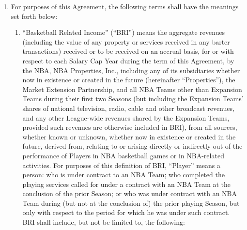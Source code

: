\documentclass[
]{book}
\providecommand{\tightlist}{%
  \setlength{\itemsep}{0pt}\setlength{\parskip}{0pt}}
\begin{document}
\begin{enumerate}
\def\labelenumi{(\alph{enumi})}
\tightlist
\item
  For purposes of this Agreement, the following terms shall have the meanings set forth below:

  \begin{enumerate}
  \def\labelenumii{(\arabic{enumii})}
  \tightlist
  \item
    ``Basketball Related Income'' (``BRI'') means the aggregate revenues (including the value of any property or services received in any barter transactions) received or to be received on an accrual basis, for or with respect to each Salary Cap Year during the term of this Agreement, by the NBA, NBA Properties, Inc., including any of its subsidiaries whether now in existence or created in the future (hereinafter ``Properties''), the Market Extension Partnership, and all NBA Teams other than Expansion Teams during their first two Seasons (but including the Expansion Teams' shares of national television, radio, cable and other broadcast revenues, and any other League-wide revenues shared by the Expansion Teams, provided such revenues are otherwise included in BRI), from all sources, whether known or unknown, whether now in existence or created in the future, derived from, relating to or arising directly or indirectly out of the performance of Players in NBA basketball games or in NBA-related activities. For purposes of this definition of BRI, ``Player'' means a person: who is under contract to an NBA Team; who completed the playing services called for under a contract with an NBA Team at the conclusion of the prior Season; or who was under contract with an NBA Team during (but not at the conclusion of) the prior playing Season, but only with respect to the period for which he was under such contract. BRI shall include, but not be limited to, the following:


\end{enumerate}
\end{enumerate}
\end{document}
